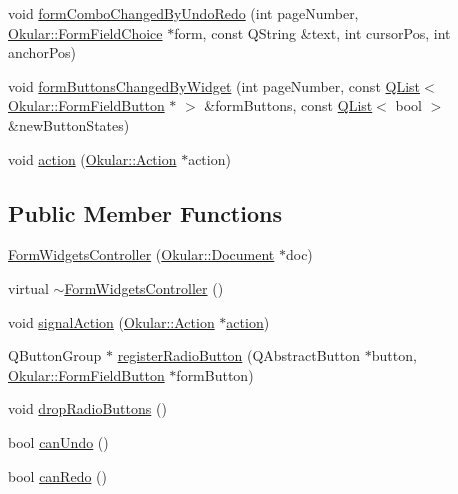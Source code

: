 \begin{DoxyCompactItemize}
\item 
void \hyperlink{classFormWidgetsController_a7a69cd267b127c5fd87319228205f77d}{form\+Combo\+Changed\+By\+Undo\+Redo} (int page\+Number, \hyperlink{classOkular_1_1FormFieldChoice}{Okular\+::\+Form\+Field\+Choice} $\ast$form, const Q\+String \&text, int cursor\+Pos, int anchor\+Pos)
\item 
void \hyperlink{classFormWidgetsController_a3b411f8bbeb3a71fad4764a888308f40}{form\+Buttons\+Changed\+By\+Widget} (int page\+Number, const \hyperlink{classQList}{Q\+List}$<$ \hyperlink{classOkular_1_1FormFieldButton}{Okular\+::\+Form\+Field\+Button} $\ast$ $>$ \&form\+Buttons, const \hyperlink{classQList}{Q\+List}$<$ bool $>$ \&new\+Button\+States)
\item 
void \hyperlink{classFormWidgetsController_a0784f265d62a8b63b1bf98a677f9d71d}{action} (\hyperlink{classOkular_1_1Action}{Okular\+::\+Action} $\ast$action)
\end{DoxyCompactItemize}
\subsection*{Public Member Functions}
\begin{DoxyCompactItemize}
\item 
\hyperlink{classFormWidgetsController_a5436468bce41665cc59eaf8167635415}{Form\+Widgets\+Controller} (\hyperlink{classOkular_1_1Document}{Okular\+::\+Document} $\ast$doc)
\item 
virtual \hyperlink{classFormWidgetsController_a43d0bb9a9d793f908288f69a064a9efb}{$\sim$\+Form\+Widgets\+Controller} ()
\item 
void \hyperlink{classFormWidgetsController_a65848efaf2d9d31121bc470dc4592ed8}{signal\+Action} (\hyperlink{classOkular_1_1Action}{Okular\+::\+Action} $\ast$\hyperlink{classFormWidgetsController_a0784f265d62a8b63b1bf98a677f9d71d}{action})
\item 
Q\+Button\+Group $\ast$ \hyperlink{classFormWidgetsController_a46b5faee7cd52e35eda20e463ea257ca}{register\+Radio\+Button} (Q\+Abstract\+Button $\ast$button, \hyperlink{classOkular_1_1FormFieldButton}{Okular\+::\+Form\+Field\+Button} $\ast$form\+Button)
\item 
void \hyperlink{classFormWidgetsController_a06c4ce604513b55ad556fefc0b626fcc}{drop\+Radio\+Buttons} ()
\item 
bool \hyperlink{classFormWidgetsController_a2711f4f025e96e95fe55c162ca321de5}{can\+Undo} ()
\item 
bool \hyperlink{classFormWidgetsController_a960c176392a58a63f271b6c561216b74}{can\+Redo} ()
\end{DoxyCompactItemize}
